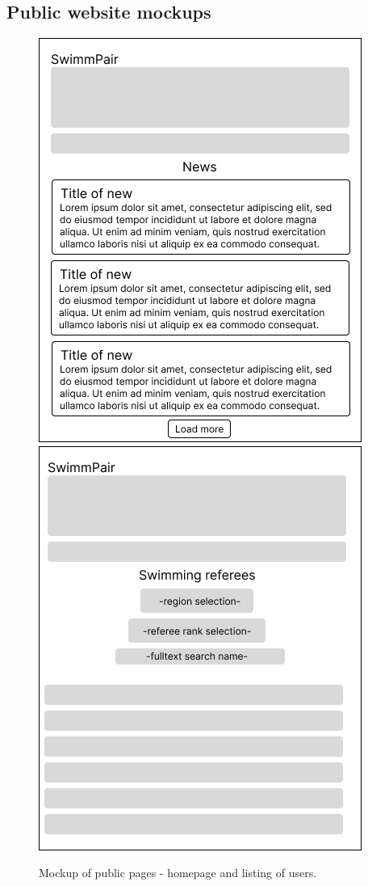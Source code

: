 \subsection*{Public website mockups}
\begin{figure}[h]	
	\centering	
    \includegraphics[scale=0.457]{img/def-U-Main.png}
    \includegraphics[scale=0.457]{img/def-U-ListingUsers.png}
	\caption{Mockup of public pages - homepage and listing of users.}
	\label{fig1.2:fepublicpages1}
\end{figure}
